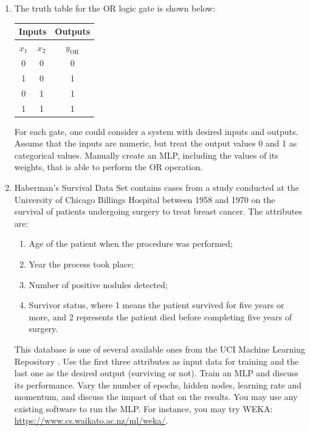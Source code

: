 \begin{enumerate}
\item The truth table for the OR logic gate is shown below:

\begin{center}
\begin{tabular}{cc|c}
\hline
\multicolumn{2}{c|}{Inputs} & \multicolumn{1}{c}{Outputs}                                  \\ \hline
$x_1$         & $x_2$        & $y_{\textrm{OR}}$  \\ \hline
0             & 0            & 0                   \\
1             & 0            & 1                   \\
0             & 1            & 1                  \\
1             & 1            & 1                  \\ \hline
\end{tabular}
\end{center}


For each gate, one could consider a system with desired inputs and outputs. Assume that the inputs are numeric, but treat the output values 0 and 1 as categorical values. Manually create an MLP, including the values of its weights, that is able to perform the OR operation.

\item  Haberman's Survival Data Set contains cases from a study conducted at the University of Chicago Billings Hospital between 1958 and 1970 on the survival of patients undergoing surgery to treat breast cancer. The attributes are:
\begin{enumerate}
    \item Age of the patient when the procedure was performed;
	\item Year the process took place;
	\item Number of positive nodules detected;
	\item Survivor status, where 1 means the patient survived for five years or more, and 2 represents the patient died before completing five years of surgery.
\end{enumerate}

This database is one of several available ones from the UCI Machine Learning Repository \cite{Dua:2019}. Use the first three attributes as input data for training and the last one as the desired output (surviving or not). Train an MLP and discuss its performance. Vary the number of epochs, hidden nodes, learning rate and momentum, and discuss the impact of that on the results. You may use any existing software to run the MLP. For instance, you may try WEKA: \url{https://www.cs.waikato.ac.nz/ml/weka/}.
\end{enumerate}

